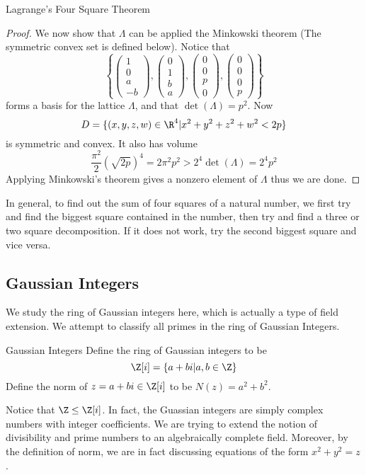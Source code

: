 \documentclass[a4paper]{article}
\begin{document}
\begin{thm}{Lagrange's Four Square Theorem}{}
\begin{proof}
We now show that $\Lambda$ can be applied the Minkowski theorem (The symmetric convex set is defined below). Notice that $$\left\{\begin{pmatrix} 1\\ 0\\ a\\ -b\end{pmatrix}, \begin{pmatrix} 0\\ 1\\ b\\ a\end{pmatrix}, \begin{pmatrix} 0\\ 0\\ p\\ 0\end{pmatrix}, \begin{pmatrix} 0\\ 0\\ 0\\ p\end{pmatrix}\right\}$$ forms a basis for the lattice $\Lambda$, and that $\det(\Lambda)=p^2$. Now $$D=\{(x,y,z,w)\in\R^4|x^2+y^2+z^2+w^2<2p\}$$ is symmetric and convex. It also has volume $$\frac{\pi^2}{2}(\sqrt{2p})^4=2\pi^2p^2>2^4\det(\Lambda)=2^4p^2$$ Applying Minkowski's theorem gives a nonzero element of $\Lambda$ thus we are done. 
\end{proof}
\end{thm}

In general, to find out the sum of four squares of a natural number, we first try and find the biggest square contained in the number, then try and find a three or two square decomposition. If it does not work, try the second biggest square and vice versa. 

\subsection{Gaussian Integers}
We study the ring of Gaussian integers here, which is actually a type of field extension. We attempt to classify all primes in the ring of Gaussian Integers. 
\begin{defn}{Gaussian Integers}{} Define the ring of Gaussian integers to be $$\Z[i]=\{a+bi|a,b\in\Z\}$$ Define the norm of $z=a+bi\in\Z[i]$ to be $N(z)=a^2+b^2$. 
\end{defn}

Notice that $\Z\leq\Z[i]$. In fact, the Guassian integers are simply complex numbers with integer coefficients. We are trying to extend the notion of divisibility and prime numbers to an algebraically complete field. Moreover, by the definition of norm, we are in fact discussing equations of the form $x^2+y^2=z$. 
\end{document}
